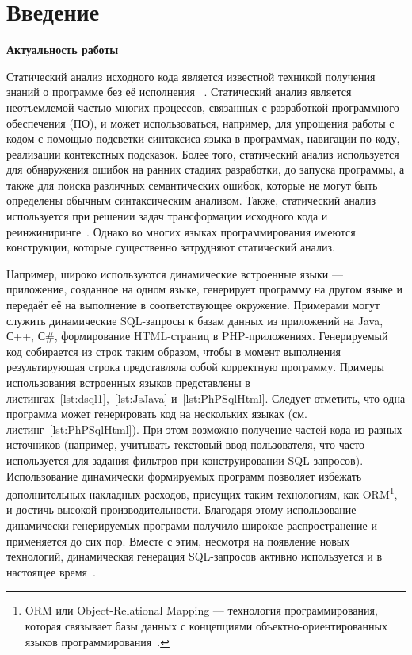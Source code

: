 \chapter*{Введение}                         %
\textbf{Актуальность работы}

Статический анализ исходного кода является известной техникой  получения знаний о программе без её исполнения ~\cite{StaticCodeAnalysis3,StaticCodeAnalysis2,StaticCodeAnalysis1}. Статический анализ является неотъемлемой частью многих процессов, связанных с разработкой программного обеспечения (ПО), и может использоваться, например, для упрощения работы с кодом с помощью подсветки синтаксиса языка в программах, навигации по коду, реализации контекстных подсказок. Более того, статический анализ используется для обнаружения ошибок на ранних стадиях разработки, до запуска программы, а также для поиска различных семантических ошибок, которые не могут быть определены обычным синтаксическим анализом.  Также, статический анализ используется при решении задач трансформации исходного кода и реинжиниринге~\cite{reengANT}. Однако во многих языках программирования имеются конструкции, которые существенно затрудняют статический анализ. 

Например, широко используются динамические встроенные языки --- приложение, созданное на одном языке, генерирует программу на другом языке и передаёт её на выполнение в соответствующее окружение. Примерами могут служить динамические SQL-запросы к базам данных из приложений на Java, С++, С\#, формирование HTML-страниц в PHP-приложениях. Генерируемый код собирается из строк таким образом, чтобы в момент выполнения результирующая строка представляла собой корректную программу. Примеры использования встроенных языков представлены в листингах~\ref{lst:dsql1},~\ref{lst:JsJava} и~\ref{lst:PhPSqlHtml}. Следует отметить, что одна программа может генерировать код на нескольких языках (см. листинг~\ref{lst:PhPSqlHtml}). При этом возможно получение частей кода из разных источников (например, учитывать текстовый ввод пользователя, что часто используется для задания фильтров при конструировании SQL-запросов). Использование динамически формируемых программ  позволяет избежать дополнительных накладных расходов, присущих таким технологиям, как ORM\footnote{ORM или Object-Relational Mapping --- технология программирования, которая связывает базы данных с концепциями объектно-ориентированных языков программирования~\cite{ORM}.}, и достичь высокой производительности. Благодаря этому использование динамически генерируемых программ получило широкое распространение и применяется до сих пор. Вместе с этим, несмотря на появление новых технологий, динамическая генерация SQL-запросов активно используется и в настоящее время~\cite{DSQLInActiveUse}.

